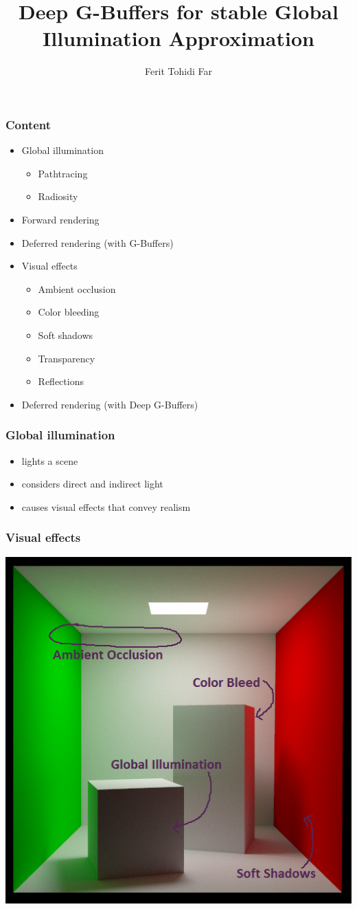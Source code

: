 \documentclass{beamer}
\title{Deep G-Buffers for stable Global Illumination Approximation}
\author{Ferit Tohidi Far}
\begin{document}
	\maketitle

	\begin{frame}
		\frametitle{Content}
		\begin{itemize}
			\item Global illumination
				\begin{itemize}
					\item Pathtracing
					\item Radiosity
				\end{itemize}
			\item Forward rendering
			\item Deferred rendering (with G-Buffers)
			\item Visual effects
				\begin{itemize}
					\item Ambient occlusion
					\item Color bleeding
					\item Soft shadows
					\item Transparency
					\item Reflections
				\end{itemize}
			\item Deferred rendering (with Deep G-Buffers)
		\end{itemize}
	\end{frame}

	\begin{frame}
		\frametitle{Global illumination}
		\begin{itemize}
			\item lights a scene
			\item considers direct and indirect light
			\item causes visual effects that convey realism
		\end{itemize}
	\end{frame}

	\begin{frame}
		\frametitle{Visual effects}
		\begin{center}
			\includegraphics[width=.7\textwidth]{img/visual_effects.png}
		\end{center}
	\end{frame}
\end{document}
